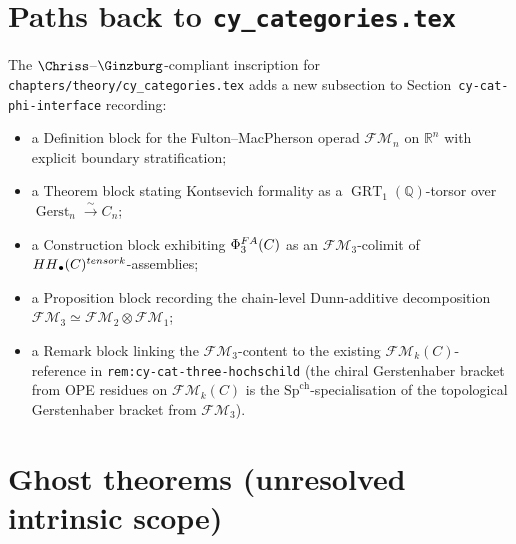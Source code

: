 \documentclass[11pt]{article}
\theoremstyle{definition}
\theoremstyle{remark}
\DeclareMathOperator{\HH}{HH}
\DeclareMathOperator{\Gerst}{Gerst}
\DeclareMathOperator{\GRT}{GRT}
\newcommand{\FM}{\mathcal{FM}}
\newcommand{\PhiFA}{\Phi^{\mathrm{FA}}}
\newcommand{\SpCh}{\mathrm{Sp}^{\mathrm{ch}}}
\begin{document}
\section{Paths back to \texttt{cy\_categories.tex}}

The $\Chriss$--$\Ginzburg$-compliant inscription for
\texttt{chapters/theory/cy\_categories.tex} adds a new subsection to
Section~\texttt{cy-cat-phi-interface} recording:
\begin{itemize}
 \item a Definition block for the Fulton--MacPherson operad $\FM_n$
       on $\mathbb{R}^n$ with explicit boundary stratification;
 \item a Theorem block stating Kontsevich formality as a
       $\GRT_1(\mathbb{Q})$-torsor over $\Gerst_n \xrightarrow{\sim} C_n$;
 \item a Construction block exhibiting $\PhiFA_3(\cC)$ as an
       $\FM_3$-colimit of $\HH_\bullet(\cC)^{\otimes k}$-assemblies;
 \item a Proposition block recording the chain-level Dunn-additive
       decomposition $\FM_3 \simeq \FM_2 \otimes \FM_1$;
 \item a Remark block linking the $\FM_3$-content to the existing
       $\FM_k(C)$-reference in \texttt{rem:cy-cat-three-hochschild}
       (the chiral Gerstenhaber bracket from OPE residues on
       $\FM_k(C)$ is the $\SpCh$-specialisation of the topological
       Gerstenhaber bracket from $\FM_3$).
\end{itemize}

\section{Ghost theorems (unresolved intrinsic scope)}
\end{document}
